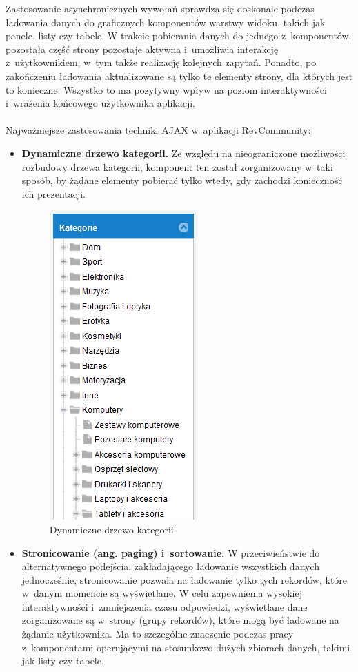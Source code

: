 Zastosowanie asynchronicznych wywołań sprawdza się doskonale podczas ładowania danych do graficznych komponentów warstwy widoku, takich jak panele, listy czy tabele. W trakcie pobierania danych do jednego z~komponentów, pozostała część strony pozostaje aktywna i~umożliwia interakcję z~użytkownikiem, w~tym także realizację kolejnych zapytań. Ponadto, po zakończeniu ładowania aktualizowane są tylko te elementy strony, dla których jest to konieczne. Wszystko to ma pozytywny wpływ na poziom interaktywności i~wrażenia końcowego użytkownika aplikacji.
\\
\\
Najważniejsze zastosowania techniki AJAX w~aplikacji RevCommunity:
\begin{itemize}
\item\textbf{Dynamiczne drzewo kategorii.} Ze względu na nieograniczone możliwości rozbudowy drzewa kategorii, komponent ten został zorganizowany w~taki sposób, by żądane elementy pobierać tylko wtedy, gdy zachodzi konieczność ich prezentacji.
\begin{figure}[H]
	\centering
	\includegraphics[scale=0.7]{images/Kategorie.png}
	\caption{Dynamiczne drzewo kategorii}
\end{figure}
\item\textbf{Stronicowanie (ang. paging) i~sortowanie.} W przeciwieństwie do alternatywnego podejścia, zakładającego ładowanie wszystkich danych jednocześnie, stronicowanie pozwala na ładowanie tylko tych rekordów, które w~danym momencie są wyświetlane. W celu zapewnienia wysokiej interaktywności i~zmniejszenia czasu odpowiedzi, wyświetlane dane zorganizowane są w~strony (grupy rekordów), które mogą być ładowane na żądanie użytkownika. Ma to szczególne znaczenie podczas pracy z~komponentami operującymi na stosunkowo dużych zbiorach danych, takimi jak listy czy tabele.

\end{itemize}
